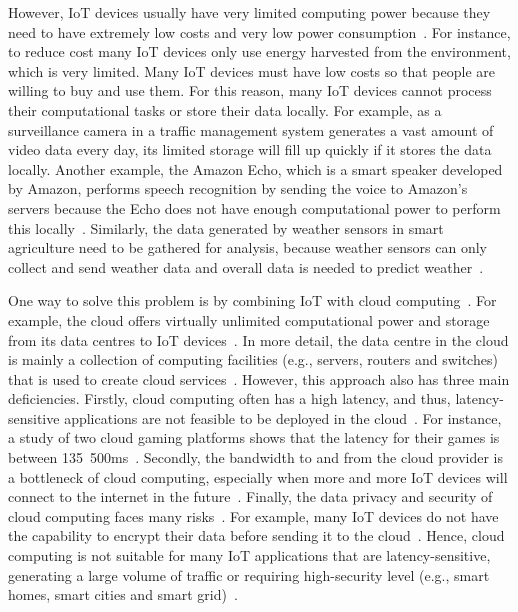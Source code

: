 \documentclass[11pt]{phdthesis}
\begin{document}
However, IoT devices usually have very limited computing power because they need to have extremely low costs and very low power consumption~\citep{chen2014vision}. For instance, to reduce cost many IoT devices only use energy harvested from the environment, which is very limited. Many IoT devices must have low costs so that people are willing to buy and use them. For this reason, many IoT devices cannot process their computational tasks or store their data locally. For example, as a surveillance camera in a traffic management system generates a vast amount of video data every day, its limited storage will fill up quickly if it stores the data locally. Another example, the Amazon Echo, which is a smart speaker developed by Amazon, performs speech recognition by sending the voice to Amazon's servers because the Echo does not have enough computational power to perform this locally~\citep{Alexa}. Similarly, the data generated by weather sensors in smart agriculture need to be gathered for analysis, because weather sensors can only collect and send weather data and overall data is needed to predict weather~\citep{mekala2017survey}.

One way to solve this problem is by combining IoT with cloud computing~\citep{chen2014vision}. For example,  the cloud offers virtually unlimited computational power and storage from its data centres to IoT devices~\citep{botta2016integration}. In more detail, the data centre in the cloud is mainly a collection of computing facilities (e.g., servers, routers and switches) that is used to create cloud services~\citep{greenberg2008cost}. However, this approach also has three main deficiencies. Firstly, cloud computing often has a high latency, and thus, latency-sensitive applications are not feasible to be deployed in the cloud~\citep{bonomi2012fog}. For instance, a study of two cloud gaming platforms shows that the latency for their games is between 135~500ms~\citep{chen2011measuring}. Secondly, the bandwidth to and from the cloud provider is a bottleneck of cloud computing, especially when more and more IoT devices will connect to the internet in the future~\citep{sarkar2018assessment}. Finally, the data privacy and security of cloud computing faces many risks~\citep{takabi2010security}. For example, many IoT devices do not have the capability to encrypt their data before sending it to the cloud~\citep{alrawais2017fog}. Hence, cloud computing is not suitable for many IoT applications that are latency-sensitive, generating a large volume of traffic or requiring high-security level (e.g., smart homes, smart cities and smart grid)~\citep{sen2015security}. 
\end{document}
